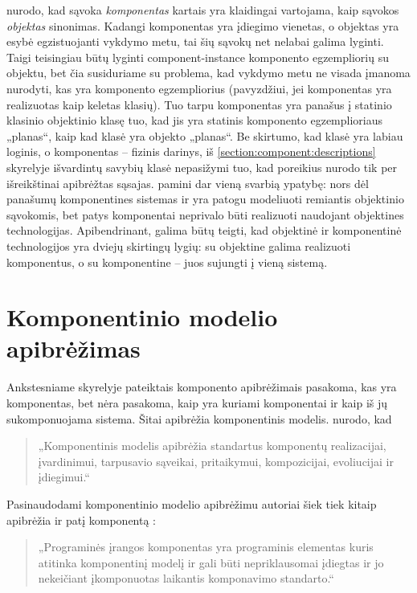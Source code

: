 \cite[36]{heineman2001component} nurodo, kad sąvoka \emph{komponentas}
kartais yra klaidingai vartojama, kaip sąvokos \emph{objektas}
sinonimas. Kadangi komponentas yra įdiegimo vienetas, o objektas yra
esybė egzistuojanti vykdymo metu, tai šių sąvokų net nelabai galima
lyginti. Taigi teisingiau būtų lyginti \gls{component-instance}{%
komponento egzempliorių} su objektu, bet čia susiduriame su problema,
kad vykdymo metu ne visada įmanoma nurodyti, kas yra komponento
egzempliorius (pavyzdžiui, jei komponentas yra realizuotas kaip keletas
klasių). Tuo tarpu komponentas yra panašus į statinio klasinio objektinio
klasę tuo, kad jis yra statinis komponento egzemplioriaus „planas“, kaip
kad klasė yra objekto „planas“. Be skirtumo, kad klasė yra
labiau loginis, o komponentas – fizinis darinys, iš
\ref{section:component:descriptions} skyrelyje išvardintų savybių
klasė nepasižymi tuo, kad poreikius nurodo tik per išreikštinai
apibrėžtas sąsajas. \cite[36]{heineman2001component} pamini dar
vieną svarbią ypatybę: nors dėl panašumų komponentines sistemas ir
yra patogu modeliuoti remiantis objektinio sąvokomis, bet patys
komponentai neprivalo būti realizuoti naudojant objektines
technologijas. Apibendrinant, galima būtų teigti, kad objektinė
ir komponentinė technologijos yra dviejų skirtingų lygių: su
objektine galima realizuoti komponentus, o su komponentine – juos
sujungti į vieną sistemą.



\section{Komponentinio modelio apibrėžimas}

\label{section:component:model}

Ankstesniame skyrelyje pateiktais komponento apibrėžimais pasakoma, kas
yra komponentas, bet nėra pasakoma, kaip yra kuriami komponentai ir kaip
iš jų sukomponuojama sistema. Šitai apibrėžia komponentinis
modelis. \cite[37]{heineman2001component} nurodo, kad
\begin{quote}
  „Komponentinis modelis apibrėžia standartus komponentų realizacijai,
  įvardinimui, tarpusavio sąveikai, pritaikymui, kompozicijai,
  evoliucijai ir įdiegimui.“
\end{quote}
Pasinaudodami komponentinio modelio apibrėžimu autoriai šiek tiek
kitaip apibrėžia ir patį komponentą \cite[7]{heineman2001component}:
\begin{quote}
  „Programinės įrangos komponentas yra programinis elementas kuris
  atitinka komponentinį modelį ir gali būti nepriklausomai įdiegtas
  ir jo nekeičiant įkomponuotas laikantis komponavimo standarto.“
\end{quote}

